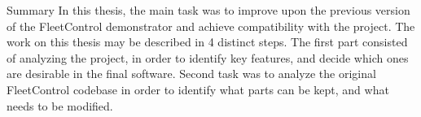 \chap Summary
In this thesis, the main task was to improve upon the previous version of the FleetControl demonstrator and achieve compatibility with the {\mapfIR} project. 
The work on this thesis may be described in 4 distinct steps.\br
The first part consisted of analyzing the {\mapfIR} project, in order to identify key features, and decide which ones are desirable in the final software.
\br
Second task was to analyze the original FleetControl codebase in order to identify what parts can be kept, and what needs to be modified.
\br
 